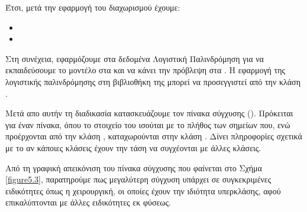 Έτσι, μετά την εφαρμογή του διαχωρισμού έχουμε:
\begin{itemize}
    \item {}
    \item {}
\end{itemize}


Στη συνέχεια, εφαρμόζουμε στα δεδομένα Λογιστική Παλινδρόμηση  για να εκπαιδεύσουμε το μοντέλο στα  και να κάνει την πρόβλεψη στα .
Η εφαρμογή της λογιστικής παλινδρόμησης στη βιβλιοθήκη της   μπορεί να προσεγγιστεί από την κλάση . 


Μετά απο αυτήν τη διαδικασία κατασκευάζουμε τον πίνακα σύγχυσης (). 
Πρόκειται για έναν  πίνακα, όπου το  στοιχείο του ισούται με το πλήθος των σημείων που, ενώ προέρχονται από την κλάση , καταχωρούνται στην κλάση . 
Δίνει πληροφορίες σχετικά με το αν κάποιες κλάσεις έχουν την τάση να συγχέονται με άλλες κλάσεις.

Από τη γραφική απεικόνιση του πίνακα σύγχυσης που φαίνεται στο Σχήμα~ \ref{figure5.3}, παρατηρούμε πως μεγαλύτερη σύγχυση υπάρχει σε συγκεκριμένες ειδικότητες όπως η χειρουργική, οι οποίες έχουν την ιδιότητα υπερκλάσης, αφού επικαλύπτονται με άλλες ειδικότητες εκ φύσεως.

